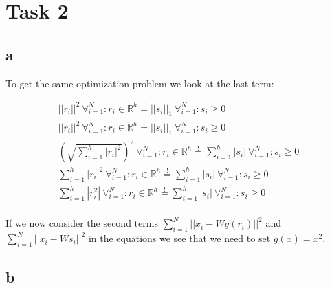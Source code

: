 \section*{Task 2}

\subsection*{a}

To get the same optimization problem we look at the last term:

\begin{gather*}
||r_i||^2 \ \forall^N_{i=1}: r_i\in\mathbb{R}^h \overset{!}{=} ||s_i||_1  \ \forall^N_{i=1}: s_i \geq 0\\
||r_i||^2 \ \forall^N_{i=1}: r_i\in\mathbb{R}^h \overset{!}{=} ||s_i||_1  \ \forall^N_{i=1}: s_i \geq 0\\
\left( \sqrt{\sum^h_{i=1} |r_i|^2} \right)^2 \ \forall^N_{i=1}: r_i\in\mathbb{R}^h \overset{!}{=} \sum^h_{i=1} |s_i| \ \forall^N_{i=1}: s_i \geq 0\\
\sum^h_{i=1} |r_i|^2 \ \forall^N_{i=1}: r_i\in\mathbb{R}^h \overset{!}{=} \sum^h_{i=1} |s_i| \ \forall^N_{i=1}: s_i \geq 0\\
\sum^h_{i=1} |r_i^2| \ \forall^N_{i=1}: r_i\in\mathbb{R}^h \overset{!}{=} \sum^h_{i=1} |s_i| \ \forall^N_{i=1}: s_i \geq 0\\
\end{gather*}

If we now consider the second terms $\sum^N_{i=1} ||x_i - W g(r_i)||^2$ and $\sum^N_{i=1} ||x_i - W s_i||^2 $ in the equations we see that we need to set $g(x) = x^2$.

\subsection*{b}



